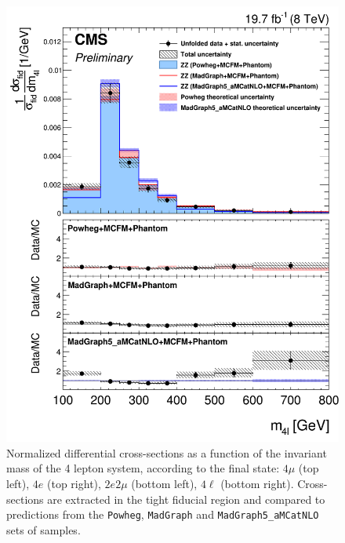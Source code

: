 \begin{figure}[hbtp]
\begin{center}
    \includegraphics[width=\cmsFigWidth]{Figures/DiffCrossSecZZTo4lMass_Unfolded_fr_Powheg_norm.png}       
    \caption{\footnotesize{Normalized differential cross-sections as a function of the  invariant mass of the 4 lepton system, according to the final state: $4\mu$ (top left), $4e$ (top right), $2e2\mu$  (bottom left),  $4\ell$ (bottom right). Cross-sections are extracted in the tight fiducial region and compared to predictions from the \texttt{Powheg}, \texttt{MadGraph} and \texttt{MadGraph5\_aMCatNLO} sets of samples.}}
    \label{fig:diff_xs_mass}
  \end{center}
\end{figure}

